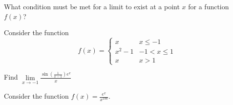 \documentclass[11pt]{exam}
\begin{document}
	\begin{questions}
		
		\addpoints
		\question[5] What condition must be met for a limit to exist at a point $x$ for a function $f(x)$?
		
		\newpage
		\addpoints
		\question Consider the function
		\[
		f(x)=
		\begin{cases}
		x & x\leq -1\\
		x^2-1 & -1<x\leq 1\\
		x & x>1 
		\end{cases}
		\]
		
		\newpage
		\addpoints
		\question[15] Find $\lim\limits_{x\to -1} \displaystyle\frac{\sin\left(\displaystyle\frac{1}{x-1}\right)e^x}{x}$
		
		\newpage
		\addpoints
		\question[10] Consider the function $f(x)=\displaystyle\frac{e^x}{x^{100}}$.
		\noaddpoints %
		
		
		
	\end{questions}
\end{document}
